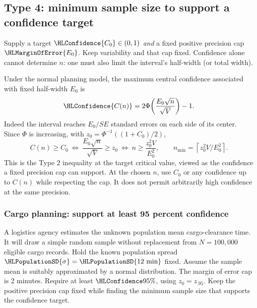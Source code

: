 \clearpage
\subsection{Type 4: minimum sample size to support a confidence target}\label{prob:t4}
Supply a target $\HLConfidence{C_0}\in(0,1)$ \emph{and} a fixed positive precision cap $\HLMarginOfError{E_0}$. Keep variability and that cap fixed. Confidence alone cannot determine $n$: one must also limit the interval's half-width (or total width).

Under the normal planning model, the maximum central confidence associated with fixed half-width $E_0$ is
\[
\HLConfidence{C(n)}=2\Phi\!\left(\frac{E_0\sqrt n}{\sqrt V}\right)-1.
\]
Indeed the interval reaches $E_0/SE$ standard errors on each side of its center. Since $\Phi$ is increasing, with $z_0=\Phi^{-1}((1+C_0)/2)$,
\[
C(n)\ge C_0\ \Longleftrightarrow\ \frac{E_0\sqrt n}{\sqrt V}\ge z_0
\ \Longleftrightarrow\ n\ge\frac{z_0^2V}{E_0^2},\qquad
n_{\min}=\left\lceil z_0^2V/E_0^2\right\rceil.
\]
This is the Type 2 inequality at the target critical value, viewed as the confidence a fixed precision cap can support. At the chosen $n$, use $C_0$ or any confidence up to $C(n)$ while respecting the cap. It does not permit arbitrarily high confidence at the same precision.
\medskip
\clearpage
\subsubsection{Cargo planning: support at least 95 percent confidence}\label{prob:t4-mean}
A logistics agency estimates the unknown population mean cargo-clearance time. It will draw a simple random sample without replacement from $N=100{,}000$ eligible cargo records. Hold the known population spread $\HLPopulationSD{\sigma}=\HLPopulationSD{12\text{ min}}$ fixed. Assume the sample mean is suitably approximated by a normal distribution. The margin of error cap is 2 minutes. Require at least $\HLConfidence{95\%}$, using $z_0=z_{.95}$. Keep the positive precision cap fixed while finding the minimum sample size that supports the confidence target. 
